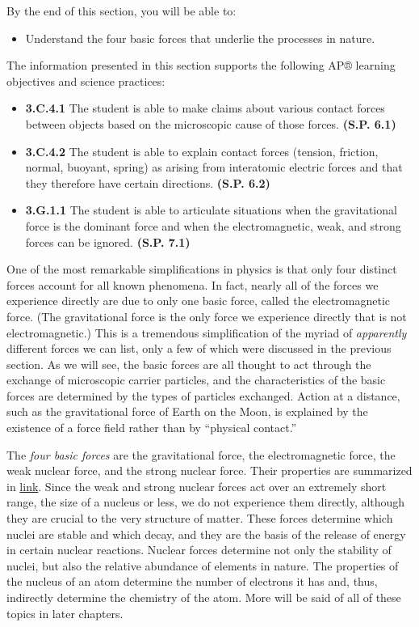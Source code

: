 \documentclass[
]{book}
\providecommand{\tightlist}{%
  \setlength{\itemsep}{0pt}\setlength{\parskip}{0pt}}
\begin{document}
By the end of this section, you will be able to:

\begin{itemize}
\tightlist
\item
  Understand the four basic forces that underlie the processes in
  nature.
\end{itemize}

The information presented in this section supports the following AP®
learning objectives and science practices:

\begin{itemize}
\tightlist
\item
  \textbf{3.C.4.1} The student is able to make claims about various contact
  forces between objects based on the microscopic cause of those
  forces. \textbf{(S.P. 6.1)}
\item
  \textbf{3.C.4.2} The student is able to explain contact forces (tension,
  friction, normal, buoyant, spring) as arising from interatomic
  electric forces and that they therefore have certain directions.
  \textbf{(S.P. 6.2)}
\item
  \textbf{3.G.1.1} The student is able to articulate situations when the
  gravitational force is the dominant force and when the
  electromagnetic, weak, and strong forces can be ignored. \textbf{(S.P.
  7.1)}
\end{itemize}

One of the most remarkable simplifications in physics is that only four
distinct forces account for all known phenomena. In fact, nearly all of
the forces we experience directly are due to only one basic force,
called the electromagnetic force. (The gravitational force is the only
force we experience directly that is not electromagnetic.) This is a
tremendous simplification of the myriad of \emph{apparently} different forces
we can list, only a few of which were discussed in the previous section.
As we will see, the basic forces are all thought to act through the
exchange of microscopic carrier particles, and the characteristics of
the basic forces are determined by the types of particles exchanged.
Action at a distance, such as the gravitational force of Earth on the
Moon, is explained by the existence of a \protect\hypertarget{import-auto-id2990636}{}{force
field} rather than by ``physical
contact.''

The \emph{four basic forces} are the gravitational force, the electromagnetic
force, the weak nuclear force, and the strong nuclear force. Their
properties are summarized in
\protect\hyperlink{import-auto-id1588108}{link}. Since the weak
and strong nuclear forces act over an extremely short range, the size of
a nucleus or less, we do not experience them directly, although they are
crucial to the very structure of matter. These forces determine which
nuclei are stable and which decay, and they are the basis of the release
of energy in certain nuclear reactions. Nuclear forces determine not
only the stability of nuclei, but also the relative abundance of
elements in nature. The properties of the nucleus of an atom determine
the number of electrons it has and, thus, indirectly determine the
chemistry of the atom. More will be said of all of these topics in later
chapters.
\end{document}
